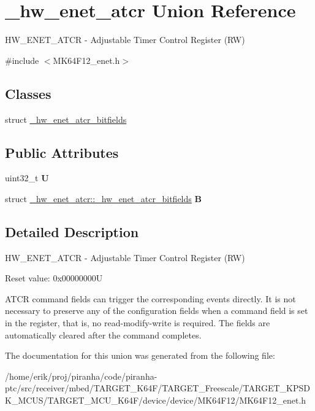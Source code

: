\hypertarget{union__hw__enet__atcr}{}\section{\+\_\+hw\+\_\+enet\+\_\+atcr Union Reference}
\label{union__hw__enet__atcr}


H\+W\+\_\+\+E\+N\+E\+T\+\_\+\+A\+T\+CR -\/ Adjustable Timer Control Register (RW)  




{\ttfamily \#include $<$M\+K64\+F12\+\_\+enet.\+h$>$}

\subsection*{Classes}
\begin{DoxyCompactItemize}
\item 
struct \hyperlink{struct__hw__enet__atcr_1_1__hw__enet__atcr__bitfields}{\+\_\+hw\+\_\+enet\+\_\+atcr\+\_\+bitfields}
\end{DoxyCompactItemize}
\subsection*{Public Attributes}
\begin{DoxyCompactItemize}
\item 
uint32\+\_\+t {\bfseries U}\hypertarget{union__hw__enet__atcr_aff9211704dc51c59585a136de8b9f208}{}\label{union__hw__enet__atcr_aff9211704dc51c59585a136de8b9f208}

\item 
struct \hyperlink{struct__hw__enet__atcr_1_1__hw__enet__atcr__bitfields}{\+\_\+hw\+\_\+enet\+\_\+atcr\+::\+\_\+hw\+\_\+enet\+\_\+atcr\+\_\+bitfields} {\bfseries B}\hypertarget{union__hw__enet__atcr_a277d19d30c875bb6498a320bd1c5f119}{}\label{union__hw__enet__atcr_a277d19d30c875bb6498a320bd1c5f119}

\end{DoxyCompactItemize}


\subsection{Detailed Description}
H\+W\+\_\+\+E\+N\+E\+T\+\_\+\+A\+T\+CR -\/ Adjustable Timer Control Register (RW) 

Reset value\+: 0x00000000U

A\+T\+CR command fields can trigger the corresponding events directly. It is not necessary to preserve any of the configuration fields when a command field is set in the register, that is, no read-\/modify-\/write is required. The fields are automatically cleared after the command completes. 

The documentation for this union was generated from the following file\+:\begin{DoxyCompactItemize}
\item 
/home/erik/proj/piranha/code/piranha-\/ptc/src/receiver/mbed/\+T\+A\+R\+G\+E\+T\+\_\+\+K64\+F/\+T\+A\+R\+G\+E\+T\+\_\+\+Freescale/\+T\+A\+R\+G\+E\+T\+\_\+\+K\+P\+S\+D\+K\+\_\+\+M\+C\+U\+S/\+T\+A\+R\+G\+E\+T\+\_\+\+M\+C\+U\+\_\+\+K64\+F/device/device/\+M\+K64\+F12/M\+K64\+F12\+\_\+enet.\+h\end{DoxyCompactItemize}
